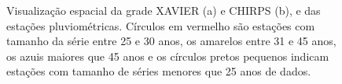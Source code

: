 \documentclass[
]{agujournal2019}
\begin{document}
\begin{figure}

\begin{minipage}{\linewidth}



\end{minipage}%
\newline
\begin{minipage}{\linewidth}



\end{minipage}%

\caption{\label{fig-Figura1}Visualização espacial da grade XAVIER (a) e
CHIRPS (b), e das estações pluviométricas. Círculos em vermelho são
estações com tamanho da série entre 25 e 30 anos, os amarelos entre 31 e
45 anos, os azuis maiores que 45 anos e os círculos pretos pequenos
indicam estações com tamanho de séries menores que 25 anos de dados.}

\end{figure}%
\end{document}
